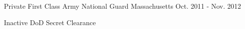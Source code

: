 
\begin{cventries}
  \cventry
    {Private First Class} %
    {Army National Guard} %
    {Massachusetts} %
    {Oct. 2011 - Nov. 2012} %
    {
      \begin{cvitems} %
        \item {Inactive DoD Secret Clearance}
      \end{cvitems}
    }

\end{cventries}